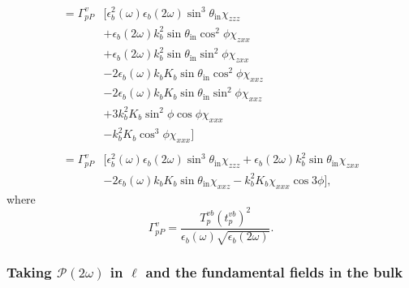 \begin{equation*}
\begin{split}
= \Gamma^{v}_{pP}&\big[
    \epsilon^{2}_{b}(\omega)\epsilon_{b}
    (2\omega)\sin^{3}\theta_{\mathrm{in}}\chi_{zzz}\\
&+  \epsilon_{b}(2\omega)k^{2}_{b}
    \sin\theta_{\mathrm{in}}\cos^{2}\phi\chi_{zxx}\\
&+  \epsilon_{b}(2\omega)k^{2}_{b}
    \sin\theta_{\mathrm{in}}\sin^{2}\phi\chi_{zxx}\\
&- 2\epsilon_{b}(\omega)k_{b}K_{b}
    \sin\theta_{\mathrm{in}}\cos^{2}\phi\chi_{xxz}\\
&- 2\epsilon_{b}(\omega)k_{b}K_{b}
    \sin\theta_{\mathrm{in}}\sin^{2}\phi\chi_{xxz}\\
&+ 3k^{2}_{b}K_{b}\sin^{2}\phi\cos\phi\chi_{xxx}\\
&-  k^{2}_{b}K_{b}\cos^{3}\phi\chi_{xxx}
\big]\\\\
= \Gamma^{v}_{pP}&\big[
    \epsilon^{2}_{b}(\omega)\epsilon_{b}(2\omega)
    \sin^{3}\theta_{\mathrm{in}}\chi_{zzz}
 +  \epsilon_{b}(2\omega)k^{2}_{b}\sin\theta_{\mathrm{in}}\chi_{zxx}\\
&- 2\epsilon_{b}(\omega)k_{b}K_{b}\sin\theta_{\mathrm{in}}\chi_{xxz}
 -  k^{2}_{b}K_{b}\chi_{xxx}\cos3\phi
\big],
\end{split}
\end{equation*}
where
\begin{equation*}
\Gamma^{v}_{pP} =
\frac{T^{v b}_{p}\left(t^{v b}_{p}\right)^{2}}
     {\epsilon_{b}(\omega)\sqrt{\epsilon_{b}(2\omega)}}.
\end{equation*}


\subsubsection{Taking \texorpdfstring{$\mathcal{P}(2\omega)$}{P(2w)} in
\texorpdfstring{$\ell$}{l} and the fundamental fields in the bulk}

